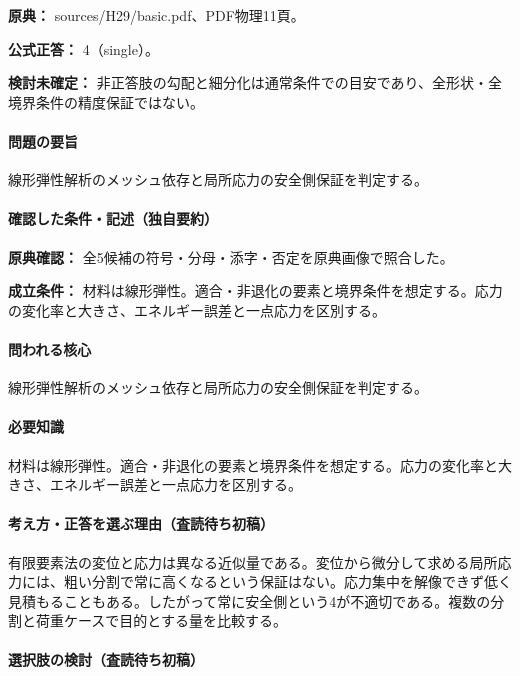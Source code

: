 \noindent\textbf{原典：} sources/H29/basic.pdf、PDF物理11頁。

\textbf{公式正答：} 4（single）。

\par\textbf{検討未確定：} 非正答肢の勾配と細分化は通常条件での目安であり、全形状・全境界条件の精度保証ではない。

\paragraph{問題の要旨} 線形弾性解析のメッシュ依存と局所応力の安全側保証を判定する。

\paragraph{確認した条件・記述（独自要約）}\mbox{}\par

\noindent\textbf{原典確認：} 全5候補の符号・分母・添字・否定を原典画像で照合した。\par

\noindent\textbf{成立条件：} 材料は線形弾性。適合・非退化の要素と境界条件を想定する。応力の変化率と大きさ、エネルギー誤差と一点応力を区別する。\par

\paragraph{問われる核心} 線形弾性解析のメッシュ依存と局所応力の安全側保証を判定する。

\paragraph{必要知識} 材料は線形弾性。適合・非退化の要素と境界条件を想定する。応力の変化率と大きさ、エネルギー誤差と一点応力を区別する。

\paragraph{考え方・正答を選ぶ理由（査読待ち初稿）} 有限要素法の変位と応力は異なる近似量である。変位から微分して求める局所応力には、粗い分割で常に高くなるという保証はない。応力集中を解像できず低く見積もることもある。したがって常に安全側という4が不適切である。複数の分割と荷重ケースで目的とする量を比較する。

\paragraph{選択肢の検討（査読待ち初稿）}\mbox{}\par

